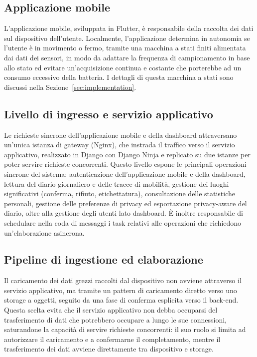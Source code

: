 \documentclass[conference]{IEEEtran}
\begin{document}
\subsection{Applicazione mobile}

L'applicazione mobile, sviluppata in Flutter, è responsabile della
raccolta dei dati sul dispositivo dell'utente. Localmente, l'applicazione
determina in autonomia se l'utente è in movimento o fermo, tramite una
macchina a stati finiti alimentata dai dati dei sensori, in modo da
adattare la frequenza di campionamento in base allo stato ed evitare un'acquisizione
continua e costante che porterebbe ad un consumo eccessivo della batteria. I dettagli di questa macchina a stati sono
discussi nella Sezione~\ref{sec:implementation}.

\subsection{Livello di ingresso e servizio applicativo}

Le richieste sincrone dell'applicazione mobile e della dashboard
attraversano un'unica istanza di gateway (Nginx), che instrada il
traffico verso il servizio applicativo, realizzato in Django con
Django Ninja e replicato su due istanze per poter servire richieste
concorrenti.
Questo livello espone le principali operazioni sincrone del sistema:
autenticazione dell'applicazione mobile e della dashboard, lettura del
diario giornaliero e delle tracce di mobilità, gestione dei luoghi
significativi (conferma, rifiuto, etichettatura), consultazione delle
statistiche personali, gestione delle preferenze di privacy ed
esportazione privacy-aware del diario, oltre alla gestione degli
utenti lato dashboard. È inoltre responsabile di schedulare nella coda
di messaggi i task relativi alle operazioni che richiedono
un'elaborazione asincrona.

\subsection{Pipeline di ingestione ed elaborazione}
\label{sec:architecture-pipeline}

Il caricamento dei dati grezzi raccolti dal dispositivo non avviene
attraverso il servizio applicativo, ma tramite un pattern di
caricamento diretto verso uno storage a oggetti, seguito da una fase di
conferma esplicita verso il back-end. Questa scelta evita che il
servizio applicativo non debba occuparsi del trasferimento di dati che potrebbero
occupare a lungo le sue connessioni, saturandone la capacità di
servire richieste concorrenti: il suo ruolo si limita ad autorizzare
il caricamento e a confermarne il completamento, mentre il
trasferimento dei dati avviene direttamente tra dispositivo e
storage.
\end{document}
